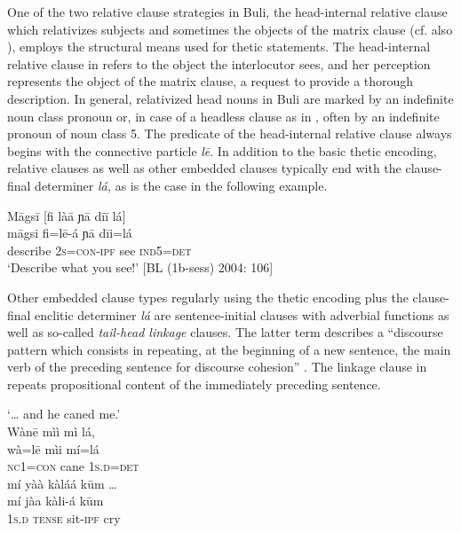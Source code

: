 \documentclass[output=paper]{langsci/langscibook}
\begin{document}
One of the two relative clause strategies in Buli, the head-internal relative clause which relativizes subjects and sometimes the objects of the matrix clause (cf. also \citealt{Hiraiwa2003}), employs the structural means used for thetic statements. The head-internal relative clause in  refers to the object the interlocutor sees, and her perception represents the object of the matrix clause, a request to provide a thorough description. In general, relativized head nouns in Buli are marked by an indefinite noun class pronoun or, in case of a headless clause as in , often by an indefinite pronoun of noun class 5. The predicate of the head-internal relative clause always begins with the connective particle \textit{l\={e}}. In addition to the basic thetic encoding, relative clauses as well as other embedded clauses typically end with the clause-final determiner \textit{lá,} as is the case in the following example.

\ea\label{ex:schwarz:28}
\glll   M\={a}gs\={i}    \textup{[}fi là\={a}     ɲ\={a}  d\={i}\={i}   lá\textup{]}\\
    \textup{m\={a}gsi}    fi=l\={e}-á     ɲ\={a}  {d\={i}i=lá}\\
       describe    2\textsc{s}=\textsc{con}-\textsc{ipf}   see     \textsc{ind}5=\textsc{det}\\
\glt ‘Describe what you see!’ [BL (1b-sess) 2004: 106]
\z

Other embedded clause types regularly using the thetic encoding plus the clause-final enclitic determiner \textit{lá} are sentence-initial clauses with adverbial functions as well as so-called \textit{tail-head linkage} clauses. The latter term describes a “discourse pattern which consists in repeating, at the beginning of a new sentence, the main verb of the preceding sentence for discourse cohesion” \citep[109]{Guillaume2011}. The linkage clause in  repeats propositional content of the immediately preceding sentence. 

\ea\label{ex:schwarz:29}
‘… and he caned me.’\\

\glll   Wàn\={e}  mìì  mì   lá,\\
  \textup{wà=l\={e}}  mìi  mí=lá\\
     \textsc{nc}1=\textsc{con} cane  1\textsc{s}.\textsc{d}=\textsc{det}\\
     
\glll   mí    yàà  kàláá    k\={u}m …\\
    \textup{mí}    jàa  kàli-á    k\={u}m\\
       1\textsc{s}.\textsc{d}  \textsc{tense}  sit-\textsc{ipf}    cry\\
       
\end{document}
